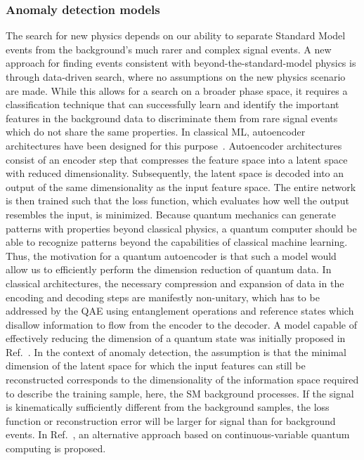 \subsubsection{Anomaly detection models} 
\label{sec:qvae_classification}
The search for new physics depends on our ability to separate Standard Model events from the background's much rarer and complex signal events.
A new approach for finding events consistent with beyond-the-standard-model physics is through data-driven search, where no assumptions on the new physics scenario are made.
While this allows for a search on a broader phase space, it requires a classification technique that can successfully learn and identify the important features in the background data to discriminate them from rare signal events which do not share the same properties.
In classical ML, autoencoder architectures have been designed for this purpose~\cite{vaes_classical}.
%
Autoencoder architectures consist of an encoder step that compresses the feature space into a latent space with reduced dimensionality.
Subsequently, the latent space is decoded into an output of the same dimensionality as the input feature space.
The entire network is then trained such that the loss function, which evaluates how well the output resembles the input, is minimized.
%
Because quantum mechanics can generate patterns with properties beyond classical physics, a quantum computer should be able to recognize patterns beyond the capabilities of classical machine learning.
Thus, the motivation for a quantum autoencoder is that such a model would allow us to efficiently perform the dimension reduction of quantum data.
In classical architectures, the necessary compression and expansion of data in the encoding and decoding steps are manifestly non-unitary, which has to be addressed by the QAE using entanglement operations and reference states which disallow information to flow from the encoder to the decoder.
A model capable of effectively reducing the dimension of a quantum state was initially proposed in Ref.~\cite{Romero2017}.
%
In the context of anomaly detection, the assumption is that the minimal dimension of the latent space for which the input features can still be reconstructed corresponds to the dimensionality of the information space required to describe the training sample, here, the SM background processes.
If the signal is kinematically sufficiently different from the background samples, the loss function or reconstruction error will be larger for signal than for background events.
%
In Ref.~\cite{2021BlancePhotonic}, an alternative approach based on continuous-variable quantum computing is proposed.
